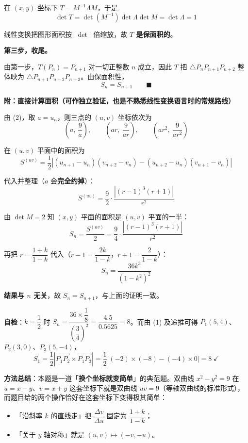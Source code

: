 \begin{answer}
在 $(x,y)$ 坐标下 $T=M^{-1}\Lambda M$，于是
\nopagebreak[4]
\[\det T=\det\left(M^{-1}\right)\det\Lambda\det M=\det\Lambda=1\]

线性变换把图形面积按 $\left|\det\right|$ 倍缩放，故 \textbf{$T$ 是保面积的}。

\textbf{第三步，收尾。}

由第一步，$T\left(P_n\right)=P_{n+1}$ 对一切正整数 $n$ 成立，因此 $T$ 把 $\triangle P_nP_{n+1}P_{n+2}$ 整体映为 $\triangle P_{n+1}P_{n+2}P_{n+3}$。由保面积性，
\nopagebreak[4]
\[S_n=S_{n+1}\qquad\blacksquare\]

\par\medskip

\textbf{附：直接计算面积（可作独立验证，也是不熟悉线性变换语言时的常规路线）}

由 (2)，取 $a=u_n$，则三点的 $(u,v)$ 坐标依次为
\nopagebreak[4]
\[\left(a,\ \frac9a\right),\qquad\left(ar,\ \frac9{ar}\right),\qquad\left(ar^{2},\ \frac9{ar^{2}}\right)\]

在 $(u,v)$ 平面中的面积为
\nopagebreak[4]
\[S^{(uv)}=\frac12\left|\left(u_{n+1}-u_n\right)\left(v_{n+2}-v_n\right)-\left(u_{n+2}-u_n\right)\left(v_{n+1}-v_n\right)\right|\]

代入并整理（$a$ 会\textbf{完全约掉}）：
\nopagebreak[4]
\[S^{(uv)}=\frac92\cdot\frac{\left|(r-1)^{3}(r+1)\right|}{r^{2}}\]

由 $\det M=2$ 知 $(x,y)$ 平面的面积是 $(u,v)$ 平面的一半：
\nopagebreak[4]
\[S_n=\frac{S^{(uv)}}2=\frac94\cdot\frac{\left|(r-1)^{3}(r+1)\right|}{r^{2}}\]

再把 $r=\dfrac{1+k}{1-k}$ 代入（$r-1=\dfrac{2k}{1-k}$，$r+1=\dfrac2{1-k}$）：
\nopagebreak[4]
\[S_n=\frac{36k^{3}}{\left(1-k^{2}\right)^{2}}\]

\textbf{结果与 $n$ 无关}，故 $S_n=S_{n+1}$，与上面的证明一致。

\textbf{自检}：$k=\dfrac12$ 时 $S_n=\dfrac{36\times\dfrac18}{\left(\dfrac34\right)^{2}}=\dfrac{4.5}{0.5625}=8$。而由 (1) 及递推可得 $P_1(5,4)$、$P_2(3,0)$、$P_3(5,-4)$，
\nopagebreak[4]
\[S_1=\frac12\left|\overrightarrow{P_1P_2}\times\overrightarrow{P_1P_3}\right|=\frac12\left|(-2)\times(-8)-(-4)\times0\right|=8\ \checkmark\]


\begin{gktip}
\textbf{方法总结}：本题是一道「\textbf{换个坐标就变简单}」的典范题。双曲线 $x^{2}-y^{2}=9$ 在 $u=x-y$、$v=x+y$ 这套坐标下就是双曲线 $uv=9$（等轴双曲线的标准形式），而题目给的两个操作恰好在这套坐标下变得极其简单：
\begin{itemize}
\item 「沿斜率 $k$ 的直线走」把 $\dfrac{\Delta v}{\Delta u}$ 固定为 $\dfrac{1+k}{1-k}$；
\item 「关于 $y$ 轴对称」就是 $(u,v)\mapsto(-v,-u)$。
\end{itemize}


\end{gktip}
\end{answer}
